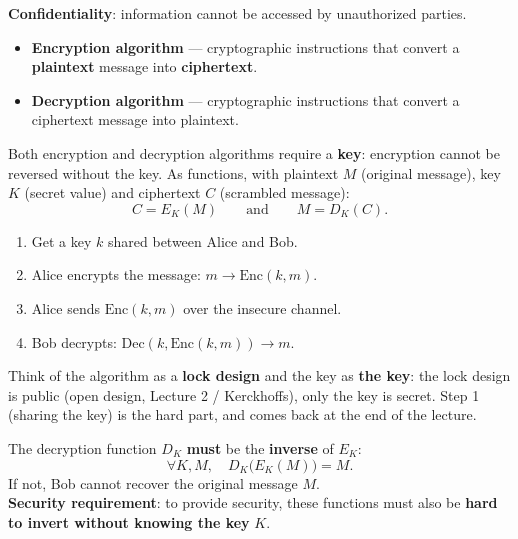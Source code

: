 \begin{defnbox}[title=Encryption and decryption]
\textbf{Confidentiality}: information cannot be accessed by unauthorized parties.
\begin{itemize}
  \item \textbf{Encryption algorithm} --- cryptographic instructions that convert a
        \textbf{plaintext} message into \textbf{ciphertext}.
  \item \textbf{Decryption algorithm} --- cryptographic instructions that convert a
        ciphertext message into plaintext.
\end{itemize}
Both encryption and decryption algorithms require a \textbf{key}: encryption cannot be
reversed without the key. As functions, with plaintext $M$ (original message), key $K$
(secret value) and ciphertext $C$ (scrambled message):
\[
  C = E_K(M) \qquad\text{and}\qquad M = D_K(C).
\]
\end{defnbox}

\begin{algbox}[title=Cryptographic algorithms for confidentiality]
\begin{enumerate}
  \item Get a key $k$ shared between Alice and Bob.
  \item Alice encrypts the message: $m \to \mathrm{Enc}(k, m)$.
  \item Alice sends $\mathrm{Enc}(k, m)$ over the insecure channel.
  \item Bob decrypts: $\mathrm{Dec}(k, \mathrm{Enc}(k, m)) \to m$.
\end{enumerate}
\end{algbox}

\begin{rembox}[title=Intuition]
Think of the algorithm as a \textbf{lock design} and the key as \textbf{the key}: the
lock design is public (open design, Lecture 2 / Kerckhoffs), only the key is secret.
Step 1 (sharing the key) is the hard part, and comes back at the end of the lecture.
\end{rembox}

\begin{defnbox}[title=Invertibility (the core requirement)]
The decryption function $D_K$ \textbf{must} be the \textbf{inverse} of $E_K$:
\[
  \forall K, M,\quad D_K\big(E_K(M)\big) = M .
\]
If not, Bob cannot recover the original message $M$. \\
\textbf{Security requirement}: to provide security, these functions must also be
\textbf{hard to invert without knowing the key} $K$.
\end{defnbox}

